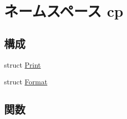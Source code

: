 \hypertarget{namespacecp}{
\section{ネームスペース cp}
\label{namespacecp}
}
\subsection*{構成}
\begin{DoxyCompactItemize}
\item 
struct \hyperlink{structcp_1_1Print}{Print}
\item 
struct \hyperlink{structcp_1_1Format}{Format}
\end{DoxyCompactItemize}
\subsection*{関数}
